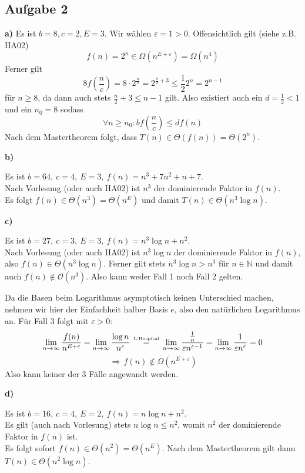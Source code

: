 \documentclass[a4paper,graphics,11pt]{article}
\newcommand{\aufgabe}[1]{\subsection*{Aufgabe #1}}
\newcommand{\up}[2]{\mathrel{\overset{\makebox[0pt]{\mbox{\normalfont\tiny #2}}}{#1}}}
\begin{document}
\newpage
\aufgabe{2}
\textbf{a)}
Es ist $b = 8, c = 2, E = 3$. Wir wählen $\varepsilon = 1 > 0$. Offensichtlich gilt (siehe z.B. HA02)
$$
    f(n) = 2^n \in \Omega(n^{E+\varepsilon}) = \Omega(n^4)
$$
Ferner gilt
$$
    8f\left(\frac{n}{c}\right)
    = 8\cdot 2^\frac{n}{2}
    = 2^{\frac{n}{2}+3}
    \leq \frac{1}{2} 2^n
    = 2^{n-1}
$$
für $n \geq 8$, da dann auch stets $\frac{n}{2} + 3 \leq n-1$ gilt. Also existiert auch ein $d = \frac{1}{2} < 1$ und ein $n_0 = 8$ sodass
$$
    \forall n \geq n_0 : bf(\frac{n}{c}) \leq df(n)
$$
Nach dem Mastertheorem folgt, dass $T(n) \in \Theta(f(n)) = \Theta(2^n)$.

\textbf{b)}

Es ist $b = 64,\ c = 4,\ E = 3,\ f(n) = n^3 + 7n^2 + n + 7$.\\
Nach Vorlesung (oder auch HA02) ist $n^3$ der dominierende Faktor in $f(n)$.\\
Es folgt $f(n) \in \Theta(n^3) = \Theta(n^E)$ und damit $T(n) \in \Theta(n^3\log n)$.

\textbf{c)}

Es ist $b = 27,\ c = 3,\ E = 3,\ f(n) = n^3\log n + n^2$.\\
Nach Vorlesung (oder auch HA02) ist $n^3\log n$ der dominierende Faktor in $f(n)$,\\
also $f(n)\in \Theta(n^3\log n)$.
Ferner gilt stets $n^3\log n > n^3$ für $n \in \mathbb{N}$ und damit auch $f(n) \notin \mathcal{O}(n^3)$.
Also kann weder Fall 1 noch Fall 2 gelten.

Da die Basen beim Logarithmus asymptotisch keinen Unterschied machen, nehmen wir hier der Einfachheit
halber Basis $e$, also den natürlichen Logarithmus an. Für Fall 3 folgt mit $\varepsilon > 0$:
$$
    \lim_{n \to \infty} \frac{f(n)}{n^{E+\varepsilon}}
    = \lim_{n \to \infty} \frac{\log n}{n^\varepsilon}
    \ \quad\up{=}{L'Hospital}\quad\
    \lim_{n \to  \infty} \frac{\frac{1}{n}}{\varepsilon n^{\varepsilon - 1}}
    = \lim_{n \to \infty} \frac{1}{\varepsilon n^\varepsilon} = 0
$$$$
    \,\Longrightarrow\, f(n) \notin \Omega(n^{E+\varepsilon})
$$
Also kann keiner der 3 Fälle angewandt werden.

\textbf{d)}

Es ist $b = 16,\ c = 4,\ E = 2,\ f(n) = n\log n + n^2$.\\
Es gilt (auch nach Vorlesung) stets $n\log n \leq n^2$, womit $n^2$ der dominierende Faktor in $f(n)$ ist.\\
Es folgt sofort $f(n) \in \Theta(n^2) = \Theta(n^E)$.
Nach dem Mastertheorem gilt dann
$T(n) \in \Theta(n^2\log n)$.
\end{document}
